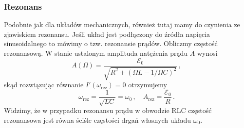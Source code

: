 \documentclass[../main.tex]{subfiles}
\begin{document}
\subsubsection*{Rezonans}
Podobnie jak dla układów mechanicznych, również tutaj mamy do czynienia ze zjawiskiem rezonansu. Jeśli układ jest podłączony do źródła napięcia sinusoidalnego to mówimy o tzw. rezonansie prądów. Obliczmy częstość rezonansową. W stanie ustalonym amplituda natężenia prądu \(A\) wynosi
\begin{equation*}
    A(\Omega)=\frac{\mathcal{E}_0}{\sqrt{R^2+(\Omega L-1/\Omega C)^2}}\,,
\end{equation*}
skąd rozwiązując równanie \(I'(\omega_\text{rez})=0\) otrzymujemy
\begin{equation*}
    \omega_\text{rez}=\frac{1}{\sqrt{LC}}=\omega_0\,,\quad A_\text{rez}=\frac{\mathcal{E}_0}{R}\,.
\end{equation*}
Widzimy, że w przypadku rezonansu prądu w obwodzie RLC częstość rezonansowa jest równa ściśle częstości drgań własnych układu \(\omega_0\).
\end{document}
